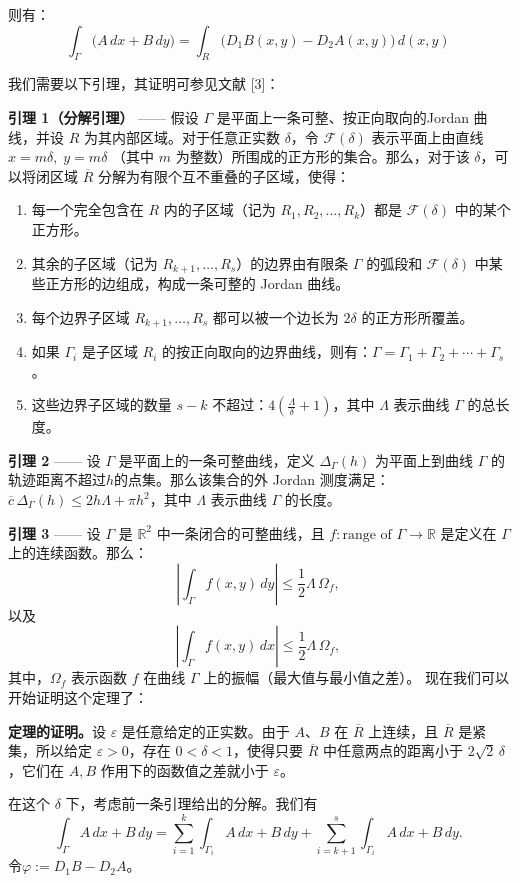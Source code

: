 则有：
$$
\int_{\Gamma} \big( A\,dx + B\,dy \big)
= 
\int_{R} \big( D_1 B(x, y) - D_2 A(x, y) \big) \, d(x, y)~
$$

我们需要以下引理，其证明可参见文献 [3]：

\textbf{引理 1（分解引理）} —— 假设 $\Gamma$ 是平面上一条可整、按正向取向的Jordan 曲线，并设 $R$ 为其内部区域。对于任意正实数 $\delta$，令 $\mathcal{F}(\delta)$ 表示平面上由直线$x = m\delta,\; y = m\delta$
（其中 $m$ 为整数）所围成的正方形的集合。那么，对于该 $\delta$，可以将闭区域 $\overline{R}$ 分解为有限个互不重叠的子区域，使得：
\begin{enumerate}
\item 每一个完全包含在 $R$ 内的子区域（记为 $R_1, R_2, \ldots, R_k$）都是 $\mathcal{F}(\delta)$ 中的某个正方形。
\item 其余的子区域（记为 $R_{k+1}, \ldots, R_s$）的边界由有限条 $\Gamma$ 的弧段和 $\mathcal{F}(\delta)$ 中某些正方形的边组成，构成一条可整的 Jordan 曲线。
\item 每个边界子区域 $R_{k+1}, \ldots, R_s$ 都可以被一个边长为 $2\delta$ 的正方形所覆盖。
\item 如果 $\Gamma_i$ 是子区域 $R_i$ 的按正向取向的边界曲线，则有：$\Gamma = \Gamma_1 + \Gamma_2 + \cdots + \Gamma_s$。
\item 这些边界子区域的数量 $s-k$ 不超过：$4\left(\frac{\Lambda}{\delta} + 1\right)$，其中 $\Lambda$ 表示曲线 $\Gamma$ 的总长度。
\end{enumerate}
\textbf{引理 2} —— 设 $\Gamma$ 是平面上的一条可整曲线，定义 $\Delta_{\Gamma}(h)$ 为平面上到曲线 $\Gamma$ 的轨迹距离不超过$h$的点集。那么该集合的外 Jordan 测度满足：$\overline{c}\,\Delta_{\Gamma}(h) \leq 2h\Lambda + \pi h^2$，其中 $\Lambda$ 表示曲线 $\Gamma$ 的长度。

\textbf{引理 3} —— 设 $\Gamma$ 是 $\mathbb{R}^2$ 中一条闭合的可整曲线，且 $f : \text{range of } \Gamma \to \mathbb{R}$ 是定义在 $\Gamma$ 上的连续函数。那么：
$$
\left| \int_{\Gamma} f(x, y)\, dy \right| \leq \frac{1}{2} \Lambda \, \Omega_f,~
$$
以及
$$
\left| \int_{\Gamma} f(x, y)\, dx \right| \leq \frac{1}{2} \Lambda \, \Omega_f,~
$$
其中，$\Omega_f$ 表示函数 $f$ 在曲线 $\Gamma$ 上的振幅（最大值与最小值之差）。
现在我们可以开始证明这个定理了：

\textbf{定理的证明。}设 $\varepsilon$ 是任意给定的正实数。由于 $A$、$B$ 在 $\overline{R}$ 上连续，且 $\overline{R}$ 是紧集，所以给定 $\varepsilon > 0$，存在 $0 < \delta < 1$，使得只要 $\overline{R}$ 中任意两点的距离小于 $2\sqrt{2}\,\delta$，它们在 $A,B$ 作用下的函数值之差就小于 $\varepsilon$。

在这个 $\delta$ 下，考虑前一条引理给出的分解。我们有
$$
\int_{\Gamma} A\,dx + B\,dy 
= \sum_{i=1}^{k} \int_{\Gamma_i} A\,dx + B\,dy 
+ \sum_{i=k+1}^{s} \int_{\Gamma_i} A\,dx + B\,dy.~
$$
令$\varphi := D_1 B - D_2 A$。
